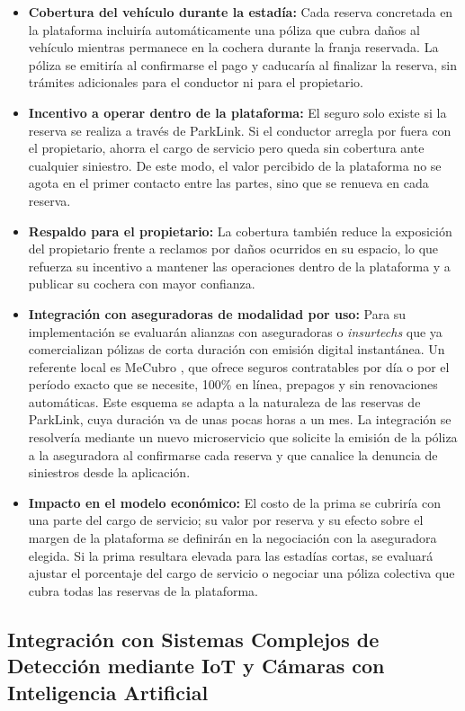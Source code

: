 \begin{itemize}
    \item \textbf{Cobertura del vehículo durante la estadía:} Cada reserva concretada en la plataforma incluiría automáticamente una póliza que cubra daños al vehículo mientras permanece en la cochera durante la franja reservada. La póliza se emitiría al confirmarse el pago y caducaría al finalizar la reserva, sin trámites adicionales para el conductor ni para el propietario.
    \item \textbf{Incentivo a operar dentro de la plataforma:} El seguro solo existe si la reserva se realiza a través de ParkLink. Si el conductor arregla por fuera con el propietario, ahorra el cargo de servicio pero queda sin cobertura ante cualquier siniestro. De este modo, el valor percibido de la plataforma no se agota en el primer contacto entre las partes, sino que se renueva en cada reserva.
    \item \textbf{Respaldo para el propietario:} La cobertura también reduce la exposición del propietario frente a reclamos por daños ocurridos en su espacio, lo que refuerza su incentivo a mantener las operaciones dentro de la plataforma y a publicar su cochera con mayor confianza.
    \item \textbf{Integración con aseguradoras de modalidad por uso:} Para su implementación se evaluarán alianzas con aseguradoras o \textit{insurtechs} que ya comercializan pólizas de corta duración con emisión digital instantánea. Un referente local es MeCubro \autocite{mecubro}, que ofrece seguros contratables por día o por el período exacto que se necesite, 100\% en línea, prepagos y sin renovaciones automáticas. Este esquema se adapta a la naturaleza de las reservas de ParkLink, cuya duración va de unas pocas horas a un mes. La integración se resolvería mediante un nuevo microservicio que solicite la emisión de la póliza a la aseguradora al confirmarse cada reserva y que canalice la denuncia de siniestros desde la aplicación.
    \item \textbf{Impacto en el modelo económico:} El costo de la prima se cubriría con una parte del cargo de servicio; su valor por reserva y su efecto sobre el margen de la plataforma se definirán en la negociación con la aseguradora elegida. Si la prima resultara elevada para las estadías cortas, se evaluará ajustar el porcentaje del cargo de servicio o negociar una póliza colectiva que cubra todas las reservas de la plataforma.
\end{itemize}

\subsection{Integración con Sistemas Complejos de Detección mediante IoT y Cámaras con Inteligencia Artificial}

